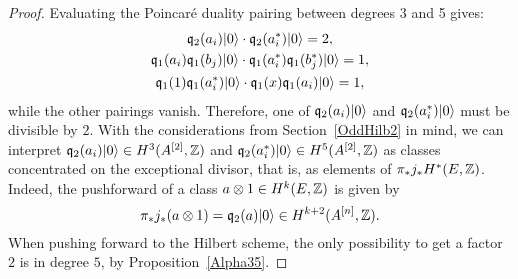 \begin{proposition}
\begin{proof}
Evaluating the Poincar\'e duality pairing between degrees 3 and 5 gives:
\begin{gather*}
 \mathfrak{q}_2(a_i)|0\rangle \cdot \mathfrak{q}_2(a^*_i)|0\rangle = 2, \\
 \mathfrak{q}_1(a_i)\mathfrak{q}_1(b_j)|0\rangle \cdot  \mathfrak{q}_1(a^*_i)\mathfrak{q}_1(b^*_j)|0\rangle = 1, \\
 \mathfrak{q}_1(1)\mathfrak{q}_1(a^*_i)|0\rangle \cdot \mathfrak{q}_1(x)\mathfrak{q}_1(a_i)|0\rangle = 1,
\end{gather*}
while the other pairings vanish. Therefore, one of $\mathfrak{q}_2(a_i)|0\rangle$ and $\mathfrak{q}_2(a^*_i)|0\rangle$ must be divisible by $2$. 
With the considerations from Section~\ref{OddHilb2} in mind, we can interpret $\mathfrak{q}_2(a_i)|0\rangle\in H^3(A^{[2]},\mathbb{Z})$ and $\mathfrak{q}_2(a^*_i)|0\rangle\in H^5(A^{[2]},\mathbb{Z})$ as classes concentrated on the exceptional divisor, that is, as elements of $\pi_* j_*H^*(E,\mathbb{Z})$. Indeed,
the pushforward of a class $a\otimes 1 \in H^{k}(E,\mathbb{Z})$ is given by 
$$
\pi_* j_*(a\otimes 1) = \mathfrak{q}_2(a)|0\rangle \in H^{k+2}(A^{[n]},\mathbb{Z}).
$$
When pushing forward to the Hilbert scheme, the only possibility to get a factor $2$ is in degree $5$, by Proposition~\ref{Alpha35}. 
\end{proof}

\end{proposition}

